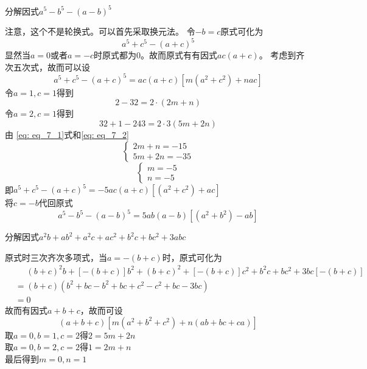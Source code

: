 \documentclass[windows,csize4,answers]{BHCexam}
\begin{document}
\begin{groups}
\begin{questions}[]
        \question[5] 分解因式$a^5-b^5-(a-b)^5$
        \begin{solution}{0.5cm}
            注意，这个不是轮换式。可以首先采取换元法。
            \methodonly 令$-b=c$原式可化为
            \[
                a^5+c^5-(a+c)^5
            \]
            显然当$a=0$或者$a=-c$时原式都为$0$。故而原式有有因式$ac(a+c)$。
            考虑到齐次五次式，故而可以设
            \[
                a^5+c^5-(a+c)^5=ac(a+c)[m(a^2+c^2)+nac]
            \]
            令$a=1,c=1$得到
            \begin{equation}
                \label{eq: eq_7_1}
                2-32=2\cdot (2m+n)
            \end{equation}
            令$a=2,c=1$得到
            \begin{equation}
                \label{eq: eq_7_2}
                32+1-243=2\cdot 3(5m+2n)
            \end{equation}  
            由 \ref{eq: eq_7_1}式和\ref{eq: eq_7_2}         
            \begin{equation}
                \begin{cases}
                    2m+n=-15 \\
                    5m+2n=-35
                \end{cases}
            \end{equation}
            \begin{equation}
                \begin{cases}
                    m=-5 \\
                    n=-5
                \end{cases}
            \end{equation}
            即$a^5+c^5-(a+c)^5=-5ac(a+c)[(a^2+c^2)+ac]$ \\
            将$c=-b$代回原式
            \[
                a^5-b^5-(a-b)^5=5ab(a-b)[(a^2+b^2)-ab]
            \]
        \end{solution}
        \vspace{3.5cm}

        \question[5] 分解因式$a^2b+ab^2+a^2c+ac^2+b^2c+bc^2+3abc$
        \begin{solution}{0.5cm}
            \method 原式时三次齐次多项式，当$a=-(b+c)$时，原式可化为
            \[
                \begin{aligned}
                    & \phantom{=} (b+c)^2b+[-(b+c)]b^2+(b+c)^2+[-(b+c)]c^2+b^2c+bc^2+3bc[-(b+c)] \\
                    &= (b+c)(b^2+bc-b^2+bc+c^2-c^2+bc-3bc) \\
                    &=0
                \end{aligned}
            \]
            故而有因式$a+b+c$，故而可设
            \[
                (a+b+c)[m(a^2+b^2+c^2)+n(ab+bc+ca)]  
            \]
            取$a=0,b=1,c=2$得$2=5m+2n$ \\ 
            取$a=0,b=2,c=2$得$1=2m+n$ \\
            最后得到$m=0,n=1$


\end{solution}
\end{questions}
\end{groups}
\end{document}
